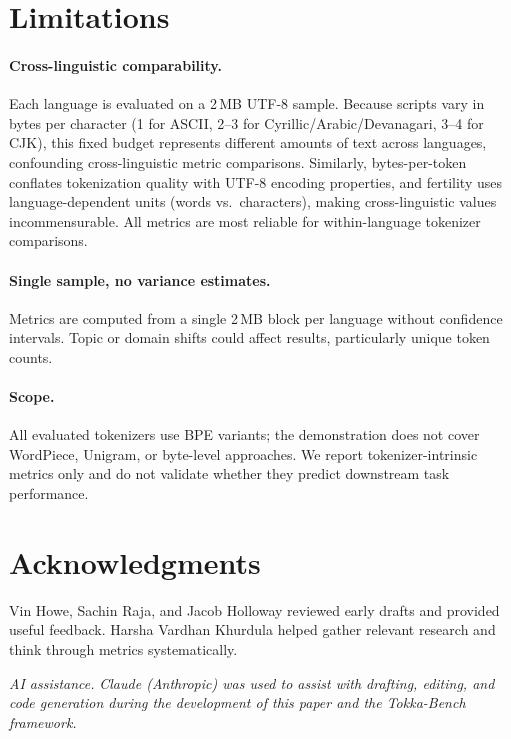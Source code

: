 \documentclass[11pt]{article}
\begin{document}
\section{Limitations}
\label{sec:limitations}

\paragraph{Cross-linguistic comparability.}
Each language is evaluated on a 2\,MB UTF-8 sample.
Because scripts vary in bytes per character (1 for ASCII, 2--3 for Cyrillic/Arabic/Devanagari, 3--4 for CJK), this fixed budget represents different amounts of text across languages, confounding cross-linguistic metric comparisons.
Similarly, bytes-per-token conflates tokenization quality with UTF-8 encoding properties, and fertility uses language-dependent units (words vs.\ characters), making cross-linguistic values incommensurable.
All metrics are most reliable for within-language tokenizer comparisons.

\paragraph{Single sample, no variance estimates.}
Metrics are computed from a single 2\,MB block per language without confidence intervals.
Topic or domain shifts could affect results, particularly unique token counts.

\paragraph{Scope.}
All evaluated tokenizers use BPE variants; the demonstration does not cover WordPiece, Unigram, or byte-level approaches.
We report tokenizer-intrinsic metrics only and do not validate whether they predict downstream task performance.

\section*{Acknowledgments}

Vin Howe, Sachin Raja, and Jacob Holloway reviewed early drafts and provided useful feedback.
Harsha Vardhan Khurdula helped gather relevant research and think through metrics systematically.

\bigskip
\noindent\textit{AI assistance.}
\textit{Claude (Anthropic) was used to assist with drafting, editing, and code generation during the development of this paper and the Tokka-Bench framework.}


\end{document}
